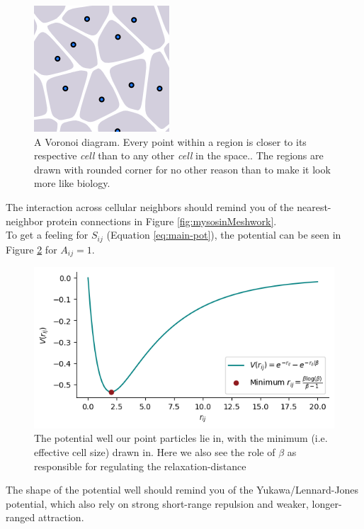 \begin{figure}
    \centering
    \includegraphics[width=0.25\linewidth]{chapters//Theory//figures/voronoi_explanation.png}
    \caption{A Voronoi diagram. Every point within a region is closer to its respective \textit{cell} than to any other \textit{cell} in the space.. The regions are drawn with rounded corner for no other reason than  to make it look more like biology.}
    \label{fig:voronoi-explanation}
\end{figure}
The interaction across cellular neighbors should remind you of the nearest-neighbor protein connections in Figure \ref{fig:mysosinMeshwork}. 
\\

To get a feeling for $S_{ij}$ (Equation \ref{eq:main-pot}), the potential can be seen in Figure \ref{fig:potential} for $A_{ij}=1$.
\begin{figure}[H]
    \centering
    \includegraphics[width=1.\linewidth]{chapters/Theory/figures/potential.png}
    \caption{The potential well our point particles lie in, with the minimum (i.e. effective cell size) drawn in. Here we also see the role of $\beta$ as responsible for regulating the relaxation-distance}
    \label{fig:potential}
\end{figure}

The shape of the potential well should remind you of the Yukawa/Lennard-Jones potential, which also rely on strong short-range repulsion and weaker, longer-ranged attraction.\\

